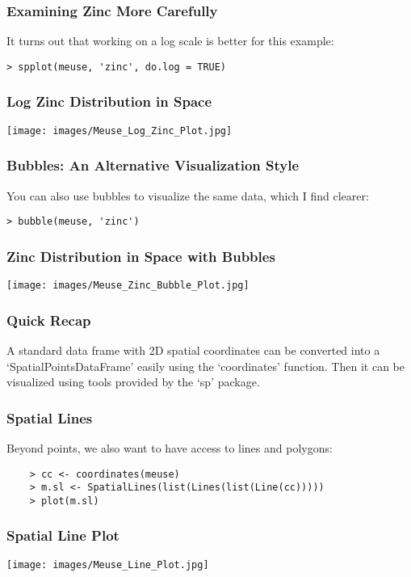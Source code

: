 \documentclass{beamer}
\begin{document}
\begin{frame}[fragile]
	\frametitle{Examining Zinc More Carefully}

	It turns out that working on a log scale is better for this example:
	
	\begin{verbatim}
> spplot(meuse, 'zinc', do.log = TRUE)
	\end{verbatim}
\end{frame}

\frame
{	
	\frametitle{Log Zinc Distribution in Space}
	
	\begin{center}
		\texttt{[image: images/Meuse\_Log\_Zinc\_Plot.jpg]}
	\end{center}
}

\begin{frame}[fragile]
	\frametitle{Bubbles: An Alternative Visualization Style}

	You can also use bubbles to visualize the same data, which I find clearer:
	
	\begin{verbatim}
> bubble(meuse, 'zinc')
	\end{verbatim}
\end{frame}

\frame
{	
	\frametitle{Zinc Distribution in Space with Bubbles}
	
	\begin{center}
		\texttt{[image: images/Meuse\_Zinc\_Bubble\_Plot.jpg]}
	\end{center}
}

\frame
{
	\frametitle{Quick Recap}
	
	A standard data frame with 2D spatial coordinates can be converted into a `SpatialPointsDataFrame' easily using the `coordinates' function. Then it can be visualized using tools provided by the `sp' package.
}

\begin{frame}[fragile]
	\frametitle{Spatial Lines}
	
	Beyond points, we also want to have access to lines and polygons:

	\begin{verbatim}
	> cc <- coordinates(meuse)
	> m.sl <- SpatialLines(list(Lines(list(Line(cc)))))
	> plot(m.sl)
	\end{verbatim}
\end{frame}

\frame
{	
	\frametitle{Spatial Line Plot}
	
	\begin{center}
		\texttt{[image: images/Meuse\_Line\_Plot.jpg]}
	\end{center}
}
\end{document}
